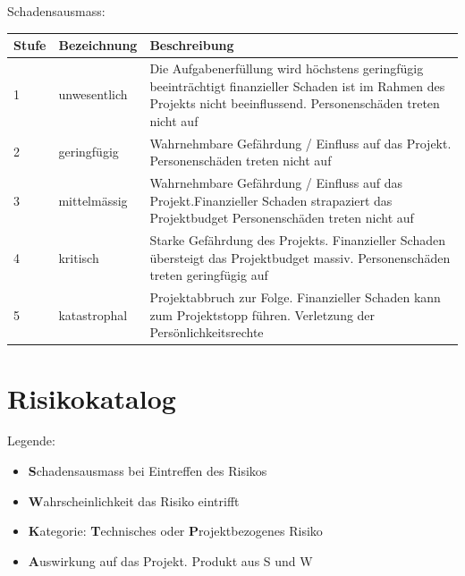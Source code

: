 \documentclass[a4paper]{report}
\begin{document}
\vspace{1em}
\noindent
Schadensausmass:

\vspace{1em}
\noindent
\begin{tabular}{|p{}|p{}|p{}|}
	\hline
	\textbf{Stufe} & \textbf{Bezeichnung} & \textbf{Beschreibung} \\
	\hline
	1 & unwesentlich & Die Aufgabenerfüllung wird höchstens geringfügig beeinträchtigt finanzieller Schaden ist im Rahmen des Projekts nicht beeinflussend. Personenschäden treten nicht auf \\
	\hline
	2 & geringfügig & Wahrnehmbare Gefährdung / Einfluss auf das Projekt. Personenschäden treten nicht auf \\
	\hline
	3 & mittelmässig & Wahrnehmbare Gefährdung / Einfluss auf das Projekt.Finanzieller Schaden strapaziert das Projektbudget
	Personenschäden treten nicht auf \\
	\hline
	4 & kritisch & Starke Gefährdung des Projekts. Finanzieller Schaden übersteigt das Projektbudget massiv. Personenschäden treten geringfügig auf \\
	\hline
	5 & katastrophal & Projektabbruch zur Folge. Finanzieller Schaden kann zum Projektstopp führen. Verletzung der Persönlichkeitsrechte
	\\
	\hline
\end{tabular}


\section{Risikokatalog}

Legende:
\begin{itemize}
	\item \textbf{S}chadensausmass bei Eintreffen des Risikos
	\item \textbf{W}ahrscheinlichkeit das Risiko eintrifft
	\item \textbf{K}ategorie: \textbf{T}echnisches oder \textbf{P}rojektbezogenes Risiko
	\item \textbf{A}uswirkung auf das Projekt. Produkt aus S und W
\end{itemize}
\end{document}

